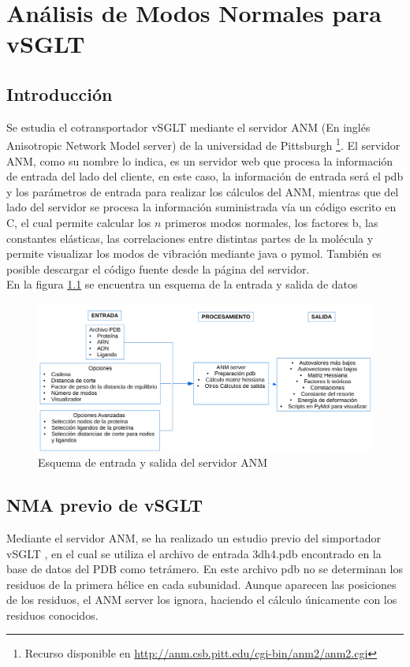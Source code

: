 \chapter{An\'{a}lisis de Modos Normales para vSGLT}\label{ch:4}

\section{Introducci\'{o}n}
Se estudia el cotransportador vSGLT mediante el servidor ANM (En ingl\'{e}s Anisotropic Network Model server) de la universidad de Pittsburgh \cite{Eyal2015}\footnote{Recurso disponible en \url{http://anm.csb.pitt.edu/cgi-bin/anm2/anm2.cgi}}. El servidor ANM, como su nombre lo indica, es un servidor web que procesa la informaci\'{o}n de entrada del lado del cliente, en este caso, la informaci\'{o}n de entrada ser\'{a} el pdb y los par\'{a}metros de entrada para realizar los c\'{a}lculos del ANM, mientras que del lado del servidor se procesa la informaci\'{o}n suministrada v\'{i}a un c\'{o}digo escrito en C, el cual permite calcular los $n$ primeros modos normales, los factores b, las constantes el\'{a}sticas, las correlaciones entre distintas partes de la mol\'{e}cula y permite visualizar los modos de vibraci\'{o}n mediante java o pymol. Tambi\'{e}n es posible descargar el c\'{o}digo fuente desde la p\'{a}gina del servidor.\\

En la figura \ref{fig:flujo} se encuentra un esquema de la entrada y salida de datos
\begin{figure}[h]
 \centering
    \includegraphics[scale=0.6]{./Kap4/flujo.pdf} 
\caption{Esquema de entrada y salida del servidor ANM}\label{fig:flujo}
\end{figure}

\section{NMA previo de vSGLT}
Mediante el servidor ANM, se ha realizado un estudio previo del simportador vSGLT \cite{Cabrera2017}, en el cual se utiliza el archivo de entrada 3dh4.pdb \cite{Faham2008} encontrado en la base de datos del PDB como tetr\'{a}mero. En este archivo pdb no se determinan los residuos de la primera h\'{e}lice en cada subunidad. Aunque aparecen las posiciones de los residuos, el ANM server los ignora, haciendo el c\'{a}lculo \'{u}nicamente con los residuos conocidos.\\

